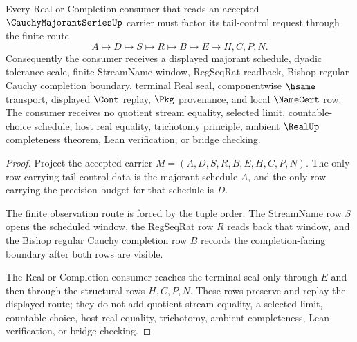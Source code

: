 \begin{theorem}
\label{thm:cauchy-majorant-series-tail-control}
Every Real or Completion consumer that reads an accepted $\CauchyMajorantSeriesUp$ carrier must factor its tail-control request through the finite route
$$
A \longmapsto D \longmapsto S \longmapsto R \longmapsto B \longmapsto E \longmapsto H,C,P,N .
$$
Consequently the consumer receives a displayed majorant schedule, dyadic tolerance scale, finite StreamName window, RegSeqRat readback, Bishop regular Cauchy completion boundary, terminal Real seal, componentwise $\hsame$ transport, displayed $\Cont$ replay, $\Pkg$ provenance, and local $\NameCert$ row. The consumer receives no quotient stream equality, selected limit, countable-choice schedule, host real equality, trichotomy principle, ambient $\RealUp$ completeness theorem, Lean verification, or bridge checking.
\end{theorem}
\begin{proof}
Project the accepted carrier $M=(A,D,S,R,B,E,H,C,P,N)$. The only row carrying tail-control data is the majorant schedule $A$, and the only row carrying the precision budget for that schedule is $D$.

The finite observation route is forced by the tuple order. The StreamName row $S$ opens the scheduled window, the RegSeqRat row $R$ reads back that window, and the Bishop regular Cauchy completion row $B$ records the completion-facing boundary after both rows are visible.

The Real or Completion consumer reaches the terminal seal only through $E$ and then through the structural rows $H,C,P,N$. These rows preserve and replay the displayed route; they do not add quotient stream equality, a selected limit, countable choice, host real equality, trichotomy, ambient completeness, Lean verification, or bridge checking.
\end{proof}



